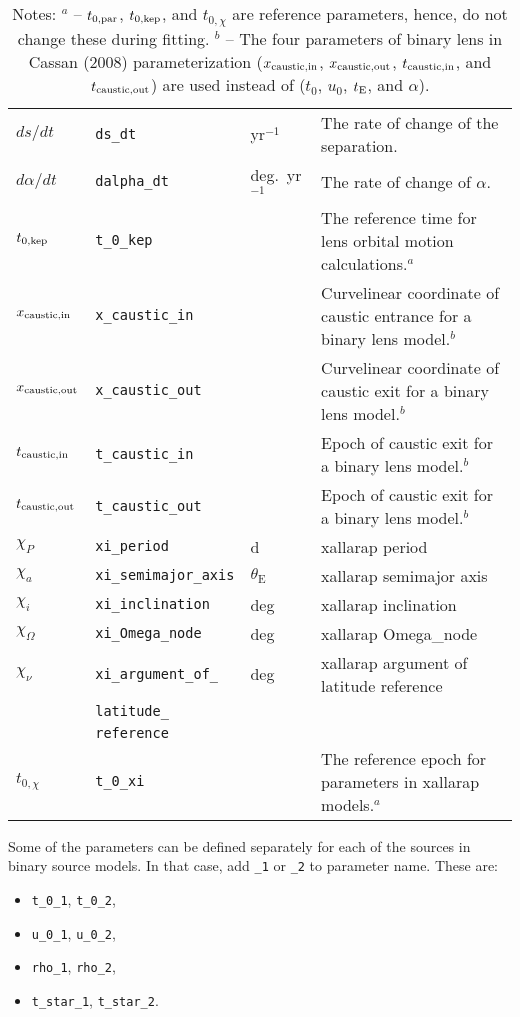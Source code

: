 \documentclass[12pt]{article}
\begin{document}
\begin{table*}[!h]
\begin{tabular}{l l l p{10cm}}
$ds/dt$ & {\tt ds\_dt} & yr$^{-1}$ & The rate of change of the separation. \\
$d\alpha/dt$ & {\tt dalpha\_dt} & deg.~yr$^{-1}$ & The rate of change of $\alpha$. \\
$t_{0,{\rm kep}}$ & {\tt t\_0\_kep} & & The reference time for lens orbital motion calculations.$^a$ \\
$x_{\rm caustic, in}$ & {\tt x\_caustic\_in} & & Curvelinear coordinate of caustic entrance for a binary lens model.$^b$ \\
$x_{\rm caustic, out}$ & {\tt x\_caustic\_out} & & Curvelinear coordinate of caustic exit for a binary lens model.$^b$ \\
$t_{\rm caustic, in}$ & {\tt t\_caustic\_in} & & Epoch of caustic exit for a binary lens model.$^b$ \\
$t_{\rm caustic, out}$ & {\tt t\_caustic\_out} & & Epoch of caustic exit for a binary lens model.$^b$ \\

$\chi_P$ & \texttt{xi\_period} & d & xallarap period \\
$\chi_a$ & \texttt{xi\_semimajor\_axis} & $\theta_\mathrm{E}$ & xallarap semimajor axis \\
$\chi_i$ & \texttt{xi\_inclination} & deg & xallarap inclination \\
$\chi_\Omega$ & \texttt{xi\_Omega\_node} & deg & xallarap Omega\_node \\
$\chi_\nu$ & \texttt{xi\_argument\_of\_} & deg & xallarap argument of latitude reference \\
 & \texttt{latitude\_} & & \\
 & \texttt{reference} & & \\
$t_{0,\chi}$ & \texttt{t\_0\_xi} & &  The reference epoch for parameters in xallarap models.$^a$\\

\hline
\end{tabular}
\caption{Notes: \newline
$^a$ -- $t_{0,{\rm par}}$, $t_{0,{\rm kep}}$, and $t_{0,\chi}$ are reference parameters, hence, do not change these during fitting. \newline
$^b$ -- The four parameters of binary lens in Cassan (2008) parameterization ($x_{\rm caustic, in}$, $x_{\rm caustic, out}$, $t_{\rm caustic, in}$, and $t_{\rm caustic, out}$) are used instead of ($t_0$, $u_0$, $t_{\rm E}$, and $\alpha$).
}
\end{table*}

Some of the parameters can be defined separately for each of the sources in binary source models.  
In that case, add {\tt \_1} or {\tt \_2} to parameter name. These are:
\begin{itemize}
\item {\tt t\_0\_1}, {\tt t\_0\_2},
\item {\tt u\_0\_1}, {\tt u\_0\_2},
\item {\tt rho\_1}, {\tt rho\_2},
\item {\tt t\_star\_1}, {\tt t\_star\_2}.
\end{itemize}
\end{document}
